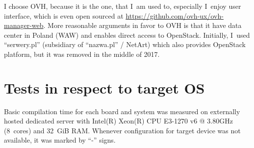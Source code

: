 \documentclass[printmode]{mgr}
\begin{document}
I choose OVH, because it is the one, that I~am used to, especially I~enjoy user interface, which is even open sourced at \url{https://github.com/ovh-ux/ovh-manager-web}.
More reasonable arguments in favor to OVH is that it have data center in Poland (WAW) and enables direct access to OpenStack.
Initially, I~used ``serwery.pl'' (subsidiary of ``nazwa.pl'' / NetArt) which also provides OpenStack platform, but it was removed in the middle of 2017.











\section{Tests in respect to target OS}

Basic compilation time for each board and system was measured on externally hosted dedicated server with Intel(R) Xeon(R) CPU E3-1270 v6 @ 3.80GHz (8~cores) and 32~GiB RAM.
Whenever configuration for target device was not available, it was marked by ``-'' signs.
\end{document}
